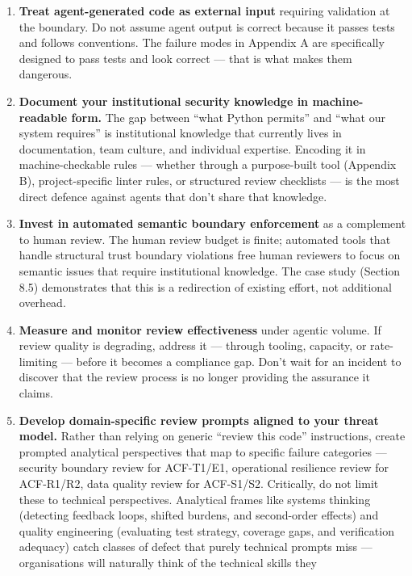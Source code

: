 \documentclass[a4paper,11pt]{report}
\begin{document}
\begin{enumerate}
\def\labelenumi{\arabic{enumi}.}
\item
  \textbf{Treat agent-generated code as external input} requiring
  validation at the boundary. Do not assume agent output is correct
  because it passes tests and follows conventions. The failure modes in
  Appendix A are specifically designed to pass tests and look correct
  --- that is what makes them dangerous.
\item
  \textbf{Document your institutional security knowledge in
  machine-readable form.} The gap between ``what Python permits'' and
  ``what our system requires'' is institutional knowledge that currently
  lives in documentation, team culture, and individual expertise.
  Encoding it in machine-checkable rules --- whether through a
  purpose-built tool (Appendix B), project-specific linter rules, or
  structured review checklists --- is the most direct defence against
  agents that don't share that knowledge.
\item
  \textbf{Invest in automated semantic boundary enforcement} as a
  complement to human review. The human review budget is finite;
  automated tools that handle structural trust boundary violations free
  human reviewers to focus on semantic issues that require institutional
  knowledge. The case study (Section 8.5) demonstrates that this is a
  redirection of existing effort, not additional overhead.
\item
  \textbf{Measure and monitor review effectiveness} under agentic
  volume. If review quality is degrading, address it --- through
  tooling, capacity, or rate-limiting --- before it becomes a compliance
  gap. Don't wait for an incident to discover that the review process is
  no longer providing the assurance it claims.
\item
  \textbf{Develop domain-specific review prompts aligned to your threat
  model.} Rather than relying on generic ``review this code''
  instructions, create prompted analytical perspectives that map to
  specific failure categories --- security boundary review for
  ACF-T1/E1, operational resilience review for ACF-R1/R2, data quality
  review for ACF-S1/S2. Critically, do not limit these to technical
  perspectives. Analytical frames like systems thinking (detecting
  feedback loops, shifted burdens, and second-order effects) and quality
  engineering (evaluating test strategy, coverage gaps, and verification
  adequacy) catch classes of defect that purely technical prompts miss
  --- organisations will naturally think of the technical skills they

\end{enumerate}
\end{document}
